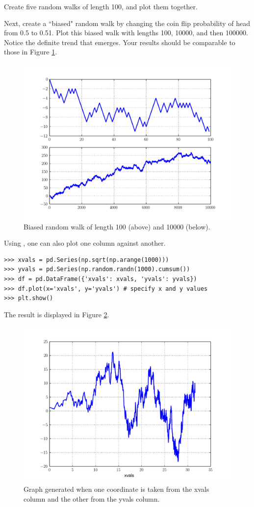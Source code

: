 \begin{problem}
Create five random walks of length 100, and plot them together.

Next, create a ``biased" random walk by changing the coin flip probability of head from 0.5 to 0.51.
Plot this biased walk with lengths 100, 10000, and then 100000. Notice the definite trend that emerges.
Your results should be comparable to those in Figure \ref{pandas:biasedRandomWalk}.
\end{problem}

\begin{figure}
\centering
\includegraphics[width=.7 \textwidth]{biasedRandomWalk.pdf}
\caption{Biased random walk of length 100 (above) and 10000 (below).}
\label{pandas:biasedRandomWalk}
\end{figure}

Using , one can also plot one column against another.

\begin{lstlisting}
>>> xvals = pd.Series(np.sqrt(np.arange(1000)))
>>> yvals = pd.Series(np.random.randn(1000).cumsum())
>>> df = pd.DataFrame({'xvals': xvals, 'yvals': yvals})
>>> df.plot(x='xvals', y='yvals') # specify x and y values
>>> plt.show()
\end{lstlisting}

The result is displayed in Figure \ref{pandas:dfPlot}.

\begin{figure}
\centering
\includegraphics[width=.7 \textwidth]{dfPlot.pdf}
\caption{ Graph generated when one coordinate is taken from the xvals column and the other from the yvals column.}
\label{pandas:dfPlot}
\end{figure}

